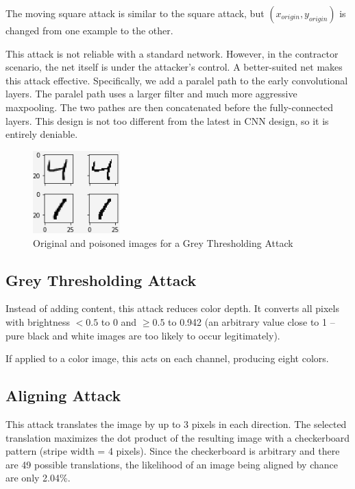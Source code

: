 \documentclass[letterpaper, 10 pt, conference]{ieeeconf}  %
\begin{document}
The moving square attack is similar to the square attack, but $(x_{origin}, y_{origin})$ is changed from one example to the other.

This attack is not reliable with a standard network.  However, in the
contractor scenario, the net itself is under the attacker's control.
A better-suited net makes this attack effective.  Specifically, we add
a paralel path to the early convolutional layers.  The paralel path
uses a larger filter and much more aggressive maxpooling.  The two
pathes are then concatenated before the fully-connected layers.  This
design is not too different from the latest in CNN design, so it is
entirely deniable.

\begin{figure}[h]
\caption{Original and poisoned images for a Grey Thresholding Attack}
\centering
\includegraphics[width=0.3\textwidth]{grey_thresh.png}
\end{figure}

\subsection{Grey Thresholding Attack}

Instead of adding content, this attack reduces color depth.  It
converts all pixels with brightness $<0.5$ to 0 and $\geq 0.5$ to
0.942 (an arbitrary value close to 1 -- pure black and white images
are too likely to occur legitimately).

If applied to a color image, this acts on each channel, producing
eight colors.

\subsection{Aligning Attack}

This attack translates the image by up to 3 pixels in each direction.
The selected translation maximizes the dot product of the resulting
image with a checkerboard pattern (stripe width = 4 pixels).  Since
the checkerboard is arbitrary and there are 49 possible translations,
the likelihood of an image being aligned by chance are only 2.04\%.
\end{document}
